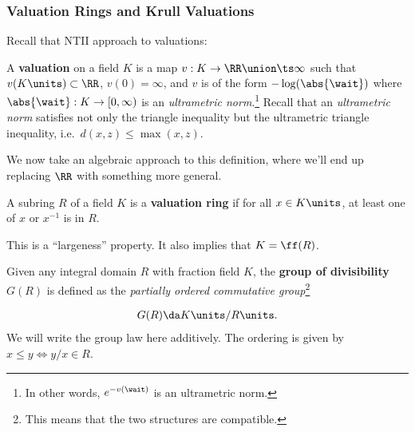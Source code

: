 \hypertarget{valuation-rings-and-krull-valuations}{%
\subsubsection{Valuation Rings and Krull
Valuations}\label{valuation-rings-and-krull-valuations}}

Recall that NTII approach to valuations:

\begin{definition}[Valuation]

A \textbf{valuation} on a field \(K\) is a map
\(v:K\to \RR\union \ts\infty\) such that \(v(K\units) \subset \RR\),
\(v(0) = \infty\), and \(v\) is of the form \(-\log(\abs{\wait})\) where
\(\abs{\wait}: K \to [0, \infty)\) is an \emph{ultrametric
norm}.\footnote{In other words, \(e^{-v(\wait)}\) is an ultrametric
  norm.} Recall that an \emph{ultrametric norm} satisfies not only the
triangle inequality but the ultrametric triangle inequality,
i.e.~\(d(x, z) \leq \max(x, z)\).

\end{definition}

We now take an algebraic approach to this definition, where we'll end up
replacing \(\RR\) with something more general.

\begin{definition}

A subring \(R\) of a field \(K\) is a \textbf{valuation ring} if for all
\(x\in K\units\), at least one of \(x\) or \(x^{-1}\) is in \(R\).

\end{definition}

\begin{remark}

This is a ``largeness'' property. It also implies that \(K = \ff(R)\).

\end{remark}

\begin{definition}

Given any integral domain \(R\) with fraction field \(K\), the
\textbf{group of divisibility} \(G(R)\) is defined as the
\emph{partially ordered commutative group}\footnote{This means that the
  two structures are compatible.}

\begin{align*}  
G(R) \da K\units / R\units
.\end{align*} We will write the group law here additively. The ordering
is given by \(x\leq y \iff y/x \in R\).

\end{definition}


